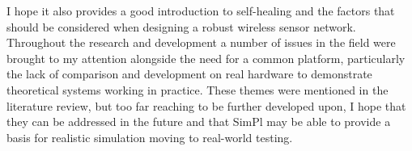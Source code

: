 \documentclass[authoryearcitations]{UoYCSproject}
\begin{document}
I hope it also provides a good introduction to self-healing and the factors that should be considered when designing a robust wireless sensor network. Throughout the research and development a number of issues in the field were brought to my attention alongside the need for a common platform, particularly the lack of comparison and development on real hardware to demonstrate theoretical systems working in practice. These themes were mentioned in the literature review, but too far reaching to be further developed upon, I hope that they can be addressed in the future and that SimPl may be able to provide a basis for realistic simulation moving to real-world testing.



\end{document}
